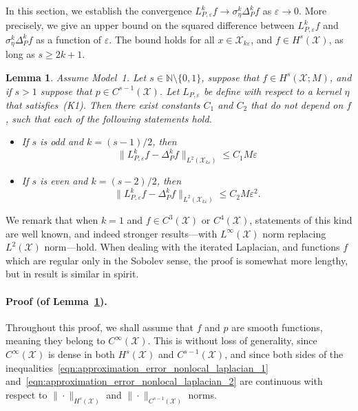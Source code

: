 \documentclass[aos]{imsart}
\theoremstyle{plain}
\newtheorem{lemma}{Lemma}
\theoremstyle{definition}
\theoremstyle{remark}
\newcommand{\mc}[1]{\mathcal{#1}}
\newcommand{\1}{\mathbf{1}}
\begin{document}
In this section, we establish the convergence $L_{P,\varepsilon}^kf \to \sigma_{\eta}^k\Delta_P^kf$ as $\varepsilon \to 0$. More precisely, we give an upper bound on the squared difference between $L_{P,\varepsilon}^kf$ and  $\sigma_{\eta}^k\Delta_P^kf$ as a function of $\varepsilon$. The bound holds for all $x \in \mc{X}_{k\varepsilon}$, and $f \in H^{s}(\mc{X})$, as long as $s \geq 2k + 1$. 
\begin{lemma}
	\label{lem:approximation_error_nonlocal_laplacian}
	Assume Model~1. Let $s \in \mathbb{N} \setminus \{0,1\}$, suppose that $f \in H^s(\mc{X};M)$, and if $s > 1$ suppose that $p \in C^{s - 1}(\mc{X})$. Let $L_{P,\varepsilon}$ be define with respect to a kernel $\eta$ that satisfies~(K1). Then there exist constants $C_1$ and $C_2$ that do not depend on $f$, such that each of the following statements hold.
	\begin{itemize}
		\item If $s$ is odd and $k = (s - 1)/2$, then
		\begin{equation}
		\label{eqn:approximation_error_nonlocal_laplacian_1}
		\|L_{P,\varepsilon}^kf - \Delta_P^kf\|_{L^2(\mc{X}_{k\varepsilon})} \leq C_1 M \varepsilon
		\end{equation}
		\item If $s$ is even and $k = (s - 2)/2$, then
		\begin{equation}
		\label{eqn:approximation_error_nonlocal_laplacian_2}
		\|L_{P,\varepsilon}^kf - \Delta_P^kf\|_{L^2(\mc{X}_{k\varepsilon})} \leq C_2 M \varepsilon^2.
		\end{equation}
	\end{itemize}
\end{lemma}
We remark that when $k = 1$ and $f \in C^3(\mc{X})$ or $C^4(\mc{X})$, statements of this kind are well known, and indeed stronger results---with $L^{\infty}(\mc{X})$ norm replacing $L^2(\mc{X})$ norm---hold. When dealing with the iterated Laplacian, and functions $f$ which are regular only in the Sobolev sense, the proof is somewhat more lengthy, but in result is similar in spirit.

\paragraph{Proof (of Lemma~\ref{lem:approximation_error_nonlocal_laplacian}).}
Throughout this proof, we shall assume that $f$ and $p$ are smooth functions, meaning they belong to $C^{\infty}(\mc{X})$. This is without loss of generality, since $C^{\infty}(\mc{X})$ is dense in both $H^s(\mc{X})$ and $C^{s - 1}(\mc{X})$, and since both sides of the inequalities~\eqref{eqn:approximation_error_nonlocal_laplacian_1} and~\eqref{eqn:approximation_error_nonlocal_laplacian_2} are continuous with respect to $\|\cdot\|_{H^s(\mc{X})}$ and $\|\cdot\|_{C^{s - 1}(\mc{X})}$ norms.
\end{document}

